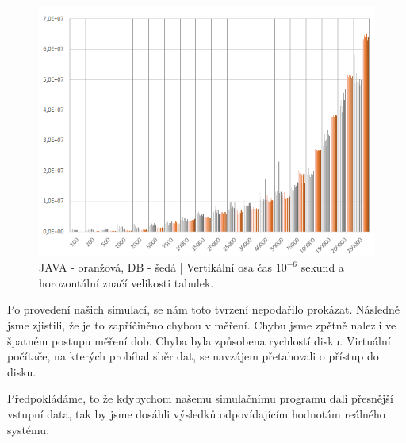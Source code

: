 \documentclass[a4paper, 11pt]{article}
\begin{document}
\begin{figure}[H]
\centering
\includegraphics[width=150mm, frame]{images/JAVA-DB-prolnuti.png}
\caption{JAVA - oranžová, DB - šedá | Vertikální osa čas $10^{-6}$ sekund a horozontální značí velikosti tabulek.}
\label{sec:obr11}
\end{figure}

Po provedení našich simulací, se nám toto tvrzení nepodařilo prokázat. Následně jsme zjistili, že je to zapříčiněno chybou v měření. Chybu jsme zpětně nalezli ve špatném postupu měření dob. Chyba byla způsobena rychlostí disku. Virtuální počítače, na kterých probíhal sběr dat, se navzájem přetahovali o přístup do disku.


Předpokládáme, to že kdybychom našemu simulačnímu programu dali přesnější vstupní data, tak by jsme dosáhli výsledků odpovídajícím hodnotám reálného systému.


\pagebreak
\newpage

\def\refname{Literatura}

\end{document}
